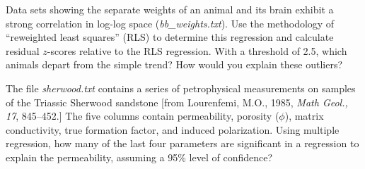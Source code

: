 \begin{problem}
Data sets showing the separate weights of an animal and its brain exhibit a strong correlation in log-log space (\emph{bb\_weights.txt}).
Use the methodology of ``reweighted least squares'' (RLS) to determine this regression and calculate residual $z$-scores
relative to the RLS regression. With a threshold of 2.5, which animals depart from the simple trend? How would you
explain these outliers?
\end{problem}

\begin{problem}
	The file \emph{sherwood.txt} contains a series of petrophysical measurements on samples
	of the Triassic Sherwood sandstone [from Lourenfemi, M.O., 1985, \emph{Math Geol., 17}, 845--452.]
	The five columns contain permeability, porosity ($\phi$), matrix
	conductivity, true formation factor, and induced polarization.  Using multiple regression,
	how many of the last four parameters are significant in a regression to explain the permeability,
	assuming a 95\% level of confidence?
\end{problem}

